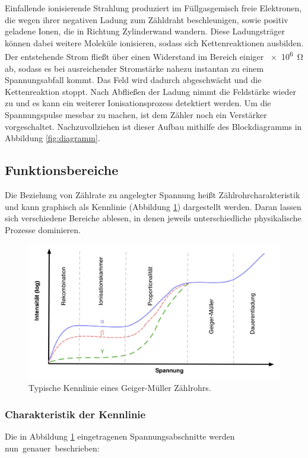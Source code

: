 Einfallende ionisierende Strahlung produziert im Füllgasgemisch freie Elektronen, die wegen ihrer negativen Ladung zum Zähldraht beschleunigen,
sowie positiv geladene Ionen, die in Richtung Zylinderwand wandern. Diese Ladungsträger können dabei weitere Moleküle ionisieren, sodass sich
Kettenreaktionen ausbilden. Der entstehende Strom fließt über einen Widerstand im Bereich einiger \qty{e6}{\ohm} ab, sodass es bei ausreichender
Stromstärke nahezu instantan zu einem Spannungsabfall kommt. Das Feld wird dadurch abgeschwächt und die Kettenreaktion stoppt. Nach Abfließen der
Ladung nimmt die Feldstärke wieder zu und es kann ein weiterer Ionisationsprozess detektiert werden. Um die Spannungspulse messbar zu machen, ist
dem Zähler noch ein Verstärker vorgeschaltet. Nachzuvollziehen ist dieser Aufbau mithilfe des Blockdiagramms in Abbildung \ref{fig:diagramm}.

\subsection{Funktionsbereiche}

Die Beziehung von Zählrate zu angelegter Spannung heißt Zählrohrcharakteristik und kann graphisch als Kennlinie (Abbildung \ref{fig:kurve})
dargestellt werden. Daran lassen sich verschiedene Bereiche ablesen, in denen jeweils unterschiedliche physikalische Prozesse dominieren.

\begin{figure}[H]
	\centering
	\includegraphics[width=0.7\linewidth]{content/grafik/kurve.jpg}
	\caption{Typische Kennlinie eines Geiger-Müller Zählrohrs.}
	\label{fig:kurve}
\end{figure}

\subsubsection{Charakteristik der Kennlinie}

Die in Abbildung \ref{fig:kurve} eingetragenen Spannungsabschnitte werden \mbox{nun genauer beschrieben:}

